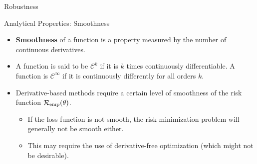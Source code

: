 \begin{vbframe}{Robustness}
% 
% 

\end{vbframe}


\begin{vbframe}{Analytical Properties: Smoothness}


\begin{itemize}
  \small
  \item \textbf{Smoothness} of a function is a property measured by 
  the number of continuous derivatives. 
  \item A function is said to be $\mathcal{C}^k$ if it is $k$ times 
  continuously differentiable. A function is $\mathcal{C}^\infty$ if it is 
  continuously differently for all orders $k$. 
  \item Derivative-based methods require a certain level of smoothness of the 
  risk function $\mathcal{R}_{\text{emp}}(\theta)$. 
  \begin{itemize}
    \small
    \item If the loss function is not smooth, the risk minimization problem will
    generally not be smooth either. 
    \item This may require the use of derivative-free optimization (which 
    might not be desirable).
  \end{itemize}
\end{itemize}

\vfill


\end{vbframe}
